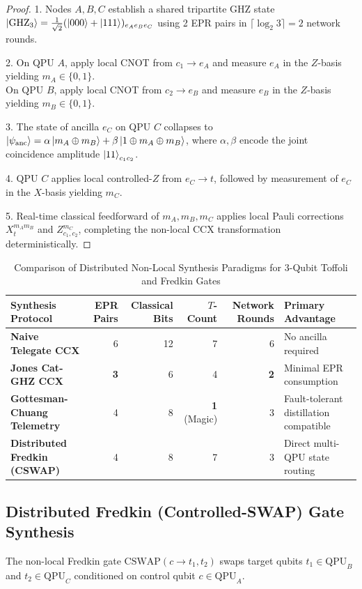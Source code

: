 \begin{proof}
1. Nodes $A, B, C$ establish a shared tripartite GHZ state $\ket{\text{GHZ}_3} = \frac{1}{\sqrt{2}}(\ket{000} + \ket{111})_{e_A e_B e_C}$ using 2 EPR pairs in $\lceil \log_2 3 \rceil = 2$ network rounds.

2. On QPU $A$, apply local CNOT from $c_1 \to e_A$ and measure $e_A$ in the $Z$-basis yielding $m_A \in \{0, 1\}$.\\
On QPU $B$, apply local CNOT from $c_2 \to e_B$ and measure $e_B$ in the $Z$-basis yielding $m_B \in \{0, 1\}$.

3. The state of ancilla $e_C$ on QPU $C$ collapses to $\ket{\psi_{\text{anc}}} = \alpha \ket{m_A \oplus m_B} + \beta \ket{1 \oplus m_A \oplus m_B}$, where $\alpha, \beta$ encode the joint coincidence amplitude $\ket{11}_{c_1 c_2}$.

4. QPU $C$ applies local controlled-$Z$ from $e_C \to t$, followed by measurement of $e_C$ in the $X$-basis yielding $m_C$.

5. Real-time classical feedforward of $m_A, m_B, m_C$ applies local Pauli corrections $X_t^{m_A m_B}$ and $Z_{c_1, c_2}^{m_C}$, completing the non-local CCX transformation deterministically.
\end{proof}

\begin{table}[htbp]
\centering
\small
\caption{Comparison of Distributed Non-Local Synthesis Paradigms for 3-Qubit Toffoli and Fredkin Gates}
\label{tab:distributed_toffoli_comparison}
\begin{tabularx}{\textwidth}{l r r r r X}
\toprule
\textbf{Synthesis Protocol} & \textbf{EPR Pairs} & \textbf{Classical Bits} & \textbf{$T$-Count} & \textbf{Network Rounds} & \textbf{Primary Advantage} \\
\midrule
\textbf{Naive Telegate CCX} & 6 & 12 & 7 & 6 & No ancilla required \\
\textbf{Jones Cat-GHZ CCX} & \textbf{3} & 6 & 4 & \textbf{2} & Minimal EPR consumption \\
\textbf{Gottesman-Chuang Telemetry} & 4 & 8 & \textbf{1} (Magic) & 3 & Fault-tolerant distillation compatible \\
\textbf{Distributed Fredkin (CSWAP)} & 4 & 8 & 7 & 3 & Direct multi-QPU state routing \\
\bottomrule
\end{tabularx}
\end{table}

\subsection{Distributed Fredkin (Controlled-SWAP) Gate Synthesis}
The non-local Fredkin gate $\text{CSWAP}(c \to t_1, t_2)$ swaps target qubits $t_1 \in \text{QPU}_B$ and $t_2 \in \text{QPU}_C$ conditioned on control qubit $c \in \text{QPU}_A$.

